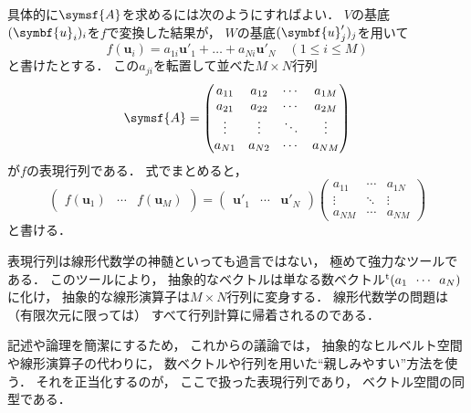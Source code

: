 \documentclass[
]{sotsu}
\begin{document}
\quad 
具体的に$\symsf{A}$を求めるには次のようにすればよい．
$V$の基底$\sequ{\symbf{u}_i}[i]$を$f$で変換した結果が，
$W$の基底$\sequ{\symbf{u}'_j}[j]$を用いて
\begin{equation*}
    f(\symbf{u}_i) = a_{1i} \symbf{u}'_1 + \dots + a_{Ni} \symbf{u}'_N
    \quad 
    (1 \leq i \leq M)
\end{equation*}
と書けたとする．
この$a_{ji}$を転置して並べた$M \times N$行列
\begin{equation*}
    \symsf{A} = 
    \begin{pmatrix}
        a_{11}  &  a_{12}  &  \cdots  &  a_{1M}  \\
        a_{21}  &  a_{22}  &  \cdots  &  a_{2M}  \\
        \vdots  &  \vdots  &  \ddots  &  \vdots  \\
        a_{N1}  &  a_{N2}  &  \cdots  &  a_{NM}
    \end{pmatrix}
\end{equation*}
が$f$の表現行列である．
式でまとめると，
\begin{equation*}
    \begin{pmatrix}
        f(\symbf{u}_1)  &  \cdots  &  f(\symbf{u}_M)
    \end{pmatrix}
    =
    \begin{pmatrix}
        \symbf{u}'_1  &  \cdots  &  \symbf{u}'_N
    \end{pmatrix}
    \begin{pmatrix}
        a_{11}  &  \cdots  &  a_{1N}  \\
        \vdots  &  \ddots  &  \vdots  \\
        a_{NM}  &  \cdots  &  a_{NM}
    \end{pmatrix}
\end{equation*}
と書ける．



\vspace{\baselineskip}



表現行列は線形代数学の神髄といっても過言ではない，
極めて強力なツールである．
このツールにより，
抽象的なベクトルは単なる数ベクトル$\cvector{a_1 ; \cdots ; a_N}$に化け，
抽象的な線形演算子は$M \times N$行列に変身する．
線形代数学の問題は
（有限次元に限っては）
すべて行列計算に帰着されるのである．

記述や論理を簡潔にするため，
これからの議論では，
抽象的なヒルベルト空間や線形演算子の代わりに，
数ベクトルや行列を用いた``親しみやすい''方法を使う．
それを正当化するのが，
ここで扱った表現行列であり，
ベクトル空間の同型である．
\end{document}
